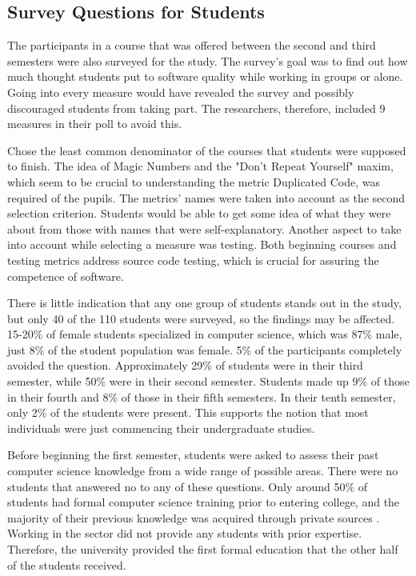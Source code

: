 \subsection{Survey Questions for Students}
The participants in a course that was offered between the second and third semesters were also surveyed for the study. The survey's goal was to find out how much thought students put to software quality while working in groups or alone. Going into every measure would have revealed the survey and possibly discouraged students from taking part.  The researchers, therefore, included 9 measures in their poll to avoid this.\par 
\cite{ref38} Chose the least common denominator of the courses that students were supposed to finish. The idea of Magic Numbers and the "Don't Repeat Yourself" maxim, which seem to be crucial to understanding the metric Duplicated Code, was required of the pupils. The metrics' names were taken into account as the second selection criterion. Students would be able to get some idea of what they were about from those with names that were self-explanatory. Another aspect to take into account while selecting a measure was testing. Both beginning courses and testing metrics address source code testing, which is crucial for assuring the competence of software.\par 
There is little indication that any one group of students stands out in the study, but only 40 of the 110 students were surveyed, so the findings may be affected. 15-20\% of female students specialized in computer science, which was 87\% male, just 8\% of the student population was female. 5\% of the participants completely avoided the question. Approximately 29\% of students were in their third semester, while 50\% were in their second semester. Students made up 9\% of those in their fourth and 8\% of those in their fifth semesters. In their tenth semester, only 2\% of the students were present. This supports the notion that most individuals were just commencing their undergraduate studies.\par 
Before beginning the first semester, students were asked to assess their past computer science knowledge from a wide range of possible areas. There were no students that answered no to any of these questions. Only around 50\% of students had formal computer science training prior to entering college, and the majority of their previous knowledge was acquired through private sources \cite{ref39}. Working in the sector did not provide any students with prior expertise. Therefore, the university provided the first formal education that the other half of the students received.\par 
